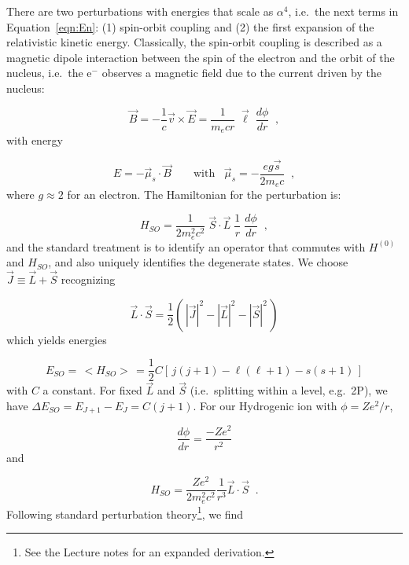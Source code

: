\documentclass[graybox]{svmult}
\def\ohf{\frac{1}{2}}
\def\ltk{\left [ \,}
\def\ltp{\left ( \,}
\def\rtk{\, \right  ] }
\def\rtp{\, \right  ) }
\begin{document}
There are two perturbations with energies that scale
as $\alpha^4$, i.e.\ the next terms in Equation~\ref{eqn:En}:
(1) spin-orbit coupling and
(2) the first expansion of the relativistic kinetic energy.
Classically, the spin-orbit coupling is described as 
a magnetic dipole interaction between the spin of the electron
and the orbit of the nucleus, i.e.\ 
the e$^{-}$ observes a magnetic field due
to the current driven by the nucleus:

\begin{equation}
\vec B = - \frac{1}{c} \vec v \times \vec 
E = \frac{1}{m_e c r} \; \vec \ell \;
\frac{d\phi}{dr} \;\; ,
\end{equation}
with energy

\begin{equation}
E = - \vec \mu_s \cdot \vec B  \quad\quad \text{with} \;\;\; 
\vec \mu_s = -\frac{e g \vec s}{2 m_e c} \;\; ,
\end{equation}
where $g \approx 2$ for an electron.
The Hamiltonian for the perturbation is:

\begin{equation}
H_{SO} = \frac{1}{2 m_e^2 c^2} \; \vec S \cdot \vec L \; \frac{1}{r} \;
\frac{d\phi}{dr} \;\; ,
\end{equation}
and the standard treatment is to 
identify an operator that commutes with 
$H^{(0)}$ and $H_{SO}$, and also
uniquely identifies the degenerate states.
We choose  $\vec J \equiv \vec L + \vec S$
recognizing

\begin{equation*}
\vec L \cdot \vec S = \ohf \ltp |\vec J|^2 - |\vec L|^2 - |\vec S|^2 \rtp
\end{equation*}
which yields energies

\begin{equation}
E_{SO} = \, <H_{SO}> \, = \ohf C \ltk j(j+1) - \ell(\ell+1) - s(s+1) \rtk
\end{equation}
with $C$ a constant.
For fixed $\vec L$ and $\vec S$ (i.e.\ splitting within a level, 
e.g.\ 2P), we have $\Delta E_{SO} = E_{J+1} - E_J = C (j+1)$.
For our Hydrogenic ion with $\phi = Z e^2/r$,

\begin{equation}
\frac{d \phi}{dr} = \frac{-Z e^2}{r^2} 
\end{equation}
and

\begin{equation}
H_{SO} = \frac{Z e^2}{2 m_e^2 c^2} \frac{1}{r^3} \vec L \cdot \vec S  \;\; .
\end{equation}
Following standard perturbation 
theory\footnote{See the Lecture notes for an expanded derivation.},
we find
\end{document}
